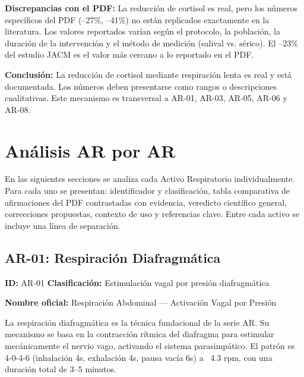 \documentclass[12pt,a4paper]{article}
\begin{document}
\textbf{Discrepancias con el PDF:} La reducción de cortisol es real, pero los
números específicos del PDF (--27\%, --41\%) no están replicados exactamente en
la literatura. Los valores reportados varían según el protocolo, la población,
la duración de la intervención y el método de medición (salival vs. sérico).
El --23\% del estudio JACM es el valor más cercano a lo reportado en el PDF.

\textbf{Conclusión:} La reducción de cortisol mediante respiración lenta es
real y está documentada. Los números deben presentarse como rangos o
descripciones cualitativas. Este mecanismo es transversal a AR-01, AR-03,
AR-05, AR-06 y AR-08.

\newpage

\section{Análisis AR por AR}

En las siguientes secciones se analiza cada Activo Respiratorio individualmente.
Para cada uno se presentan: identificador y clasificación, tabla comparativa de
afirmaciones del PDF contrastadas con evidencia, veredicto científico general,
correcciones propuestas, contexto de uso y referencias clave. Entre cada activo
se incluye una línea de separación.

\subsection*{AR-01: Respiración Diafragmática}

\textbf{ID:} AR-01 \hfill \textbf{Clasificación:} Estimulación vagal por presión diafragmática

\vspace{0.1cm}
\textbf{Nombre oficial:} Respiración Abdominal — Activación Vagal por Presión

\vspace{0.2cm}
La respiración diafragmática es la técnica fundacional de la serie AR. Su
mecanismo se basa en la contracción rítmica del diafragma para estimular
mecánicamente el nervio vago, activando el sistema parasimpático. El patrón
es 4-0-4-6 (inhalación 4s, exhalación 4s, pausa vacía 6s) a ~4.3 rpm, con
una duración total de 3--5 minutos.
\end{document}
